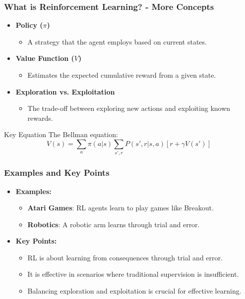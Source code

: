\documentclass[aspectratio=169]{beamer}
\begin{document}
\begin{frame}[fragile]
    \frametitle{What is Reinforcement Learning? - More Concepts}
    \begin{itemize}
        \item \textbf{Policy ($\pi$)}
            \begin{itemize}
                \item A strategy that the agent employs based on current states.
            \end{itemize}

        \item \textbf{Value Function ($V$)}
            \begin{itemize}
                \item Estimates the expected cumulative reward from a given state.
            \end{itemize}

        \item \textbf{Exploration vs. Exploitation}
            \begin{itemize}
                \item The trade-off between exploring new actions and exploiting known rewards.
            \end{itemize}
    \end{itemize}
    
    \begin{block}{Key Equation}
        The Bellman equation:
        \begin{equation}
            V(s) = \sum_{a} \pi(a|s) \sum_{s', r} P(s', r | s, a) [ r + \gamma V(s')]
        \end{equation}
    \end{block}
\end{frame}

\begin{frame}[fragile]
    \frametitle{Examples and Key Points}
    \begin{itemize}
        \item \textbf{Examples:}
            \begin{itemize}
                \item \textbf{Atari Games}: RL agents learn to play games like Breakout.
                \item \textbf{Robotics}: A robotic arm learns through trial and error.
            \end{itemize}
        
        \item \textbf{Key Points:}
            \begin{itemize}
                \item RL is about learning from consequences through trial and error.
                \item It is effective in scenarios where traditional supervision is insufficient.
                \item Balancing exploration and exploitation is crucial for effective learning.
            \end{itemize}
    \end{itemize}
\end{frame}
\end{document}
